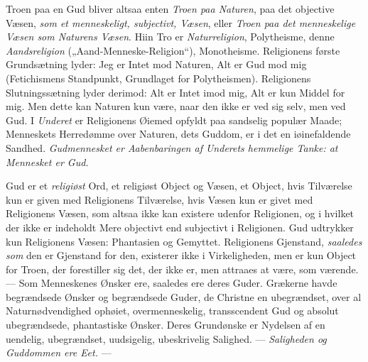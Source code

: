 Troen paa en Gud bliver altsaa enten \emph{Troen paa Naturen}, paa det objective
Væsen, \emph{som et menneskeligt, subjectivt, Væsen}, eller \emph{Troen paa det
menneskelige Væsen som Naturens Væsen}. Hiin Tro er
 \emph{Naturreligion}, Polytheisme, denne \emph{Aandsreligion}
(„Aand-Menneske-Religion“), Monotheisme. Religionens første Grundsætning lyder:
Jeg er Intet mod Naturen, Alt er Gud mod mig (Fetichismens Standpunkt,
Grundlaget for Polytheismen). Religionens Slutningssætning lyder derimod: Alt
er Intet imod mig, Alt er kun Middel for mig. Men dette kan Naturen kun være,
naar den ikke er ved sig selv, men ved Gud. I \emph{Underet} er Religionens
Øiemed opfyldt paa sandselig populær Maade; Menneskets Herredømme over Naturen,
dets Guddom, er i det en iøinefaldende Sandhed. \emph{Gudmennesket er
Aabenbaringen af Underets hemmelige Tanke: at Mennesket er Gud.}

Gud er et \emph{religiøst} Ord, et religiøst Object og Væsen, et Object, hvis
Tilværelse kun er given med Religionens Tilværelse, hvis Væsen kun er givet med
Religionens Væsen, som altsaa ikke kan existere udenfor Religionen, og i hvilket
der ikke er indeholdt Mere objectivt end subjectivt i Religionen. Gud udtrykker
kun Religionens Væsen: Phantasien og Gemyttet. Religionens Gjenstand,
\emph{saaledes som} den er Gjenstand for den, existerer ikke i Virkeligheden, men
er kun Object for Troen, der forestiller sig det, der ikke er, men attraaes at
være, som værende. --- Som Menneskenes Ønsker ere, saaledes ere deres Guder.
Grækerne havde begrændsede Ønsker og begrændsede Guder, de Christne en
ubegrændset, over al Naturnødvendighed ophøiet, overmenneskelig, transscendent
Gud og absolut ubegrændsede, phantastiske Ønsker. Deres Grundønske er Nydelsen
af en uendelig, ubegrændset, uudsigelig, ubeskrivelig Salighed. ---
\emph{Saligheden og Guddommen ere Eet.} ---

